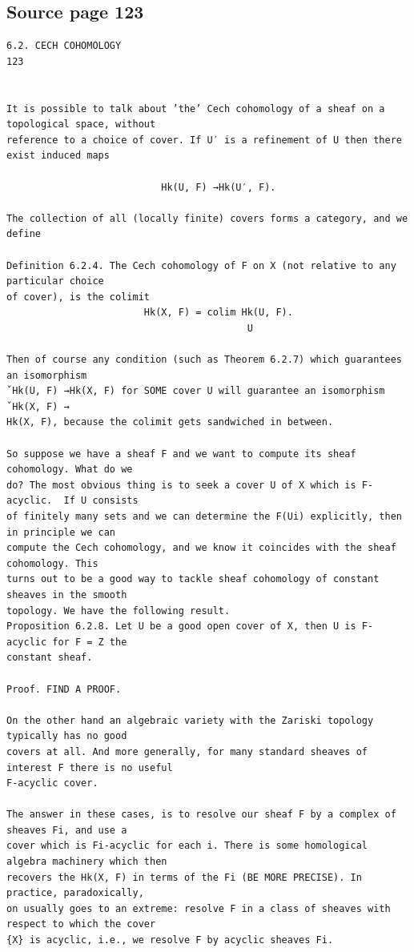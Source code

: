 \subsection*{Source page 123}
\begin{Verbatim}[fontsize=\small]
6.2. CECH COHOMOLOGY                                                   123


It is possible to talk about ’the’ Cech cohomology of a sheaf on a topological space, without
reference to a choice of cover. If U′ is a refinement of U then there exist induced maps

                           Hk(U, F) →Hk(U′, F).

The collection of all (locally finite) covers forms a category, and we define

Definition 6.2.4. The Cech cohomology of F on X (not relative to any particular choice
of cover), is the colimit
                        Hk(X, F) = colim Hk(U, F).
                                          U

Then of course any condition (such as Theorem 6.2.7) which guarantees an isomorphism
ˇHk(U, F) →Hk(X, F) for SOME cover U will guarantee an isomorphism ˇHk(X, F) →
Hk(X, F), because the colimit gets sandwiched in between.

So suppose we have a sheaf F and we want to compute its sheaf cohomology. What do we
do? The most obvious thing is to seek a cover U of X which is F-acyclic.  If U consists
of finitely many sets and we can determine the F(Ui) explicitly, then in principle we can
compute the Cech cohomology, and we know it coincides with the sheaf cohomology. This
turns out to be a good way to tackle sheaf cohomology of constant sheaves in the smooth
topology. We have the following result.
Proposition 6.2.8. Let U be a good open cover of X, then U is F-acyclic for F = Z the
constant sheaf.

Proof. FIND A PROOF.

On the other hand an algebraic variety with the Zariski topology typically has no good
covers at all. And more generally, for many standard sheaves of interest F there is no useful
F-acyclic cover.

The answer in these cases, is to resolve our sheaf F by a complex of sheaves Fi, and use a
cover which is Fi-acyclic for each i. There is some homological algebra machinery which then
recovers the Hk(X, F) in terms of the Fi (BE MORE PRECISE). In practice, paradoxically,
on usually goes to an extreme: resolve F in a class of sheaves with respect to which the cover
{X} is acyclic, i.e., we resolve F by acyclic sheaves Fi.


\end{Verbatim}
